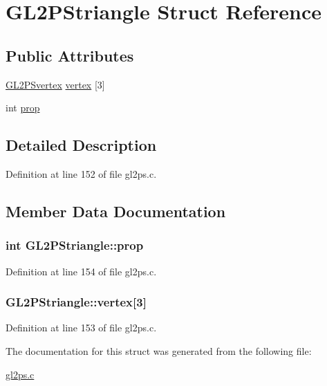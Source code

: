 \hypertarget{struct_g_l2_p_striangle}{}\section{G\+L2\+P\+Striangle Struct Reference}
\label{struct_g_l2_p_striangle}
\subsection*{Public Attributes}
\begin{DoxyCompactItemize}
\item 
\hyperlink{struct_g_l2_p_svertex}{G\+L2\+P\+Svertex} \hyperlink{struct_g_l2_p_striangle_a76b172e3cf7d6bc6d99c30cc25904a15}{vertex} \mbox{[}3\mbox{]}
\item 
int \hyperlink{struct_g_l2_p_striangle_ae313fe2f6a91c7656d2490f43c7cdac5}{prop}
\end{DoxyCompactItemize}


\subsection{Detailed Description}


Definition at line 152 of file gl2ps.\+c.



\subsection{Member Data Documentation}
\hypertarget{struct_g_l2_p_striangle_ae313fe2f6a91c7656d2490f43c7cdac5}{}
\subsubsection[{prop}]{\setlength{\rightskip}{0pt plus 5cm}int G\+L2\+P\+Striangle\+::prop}\label{struct_g_l2_p_striangle_ae313fe2f6a91c7656d2490f43c7cdac5}


Definition at line 154 of file gl2ps.\+c.

\hypertarget{struct_g_l2_p_striangle_a76b172e3cf7d6bc6d99c30cc25904a15}{}
\subsubsection[{vertex}]{ G\+L2\+P\+Striangle\+::vertex\mbox{[}3\mbox{]}}\label{struct_g_l2_p_striangle_a76b172e3cf7d6bc6d99c30cc25904a15}


Definition at line 153 of file gl2ps.\+c.



The documentation for this struct was generated from the following file\+:\begin{DoxyCompactItemize}
\item 
\hyperlink{gl2ps_8c}{gl2ps.\+c}\end{DoxyCompactItemize}
